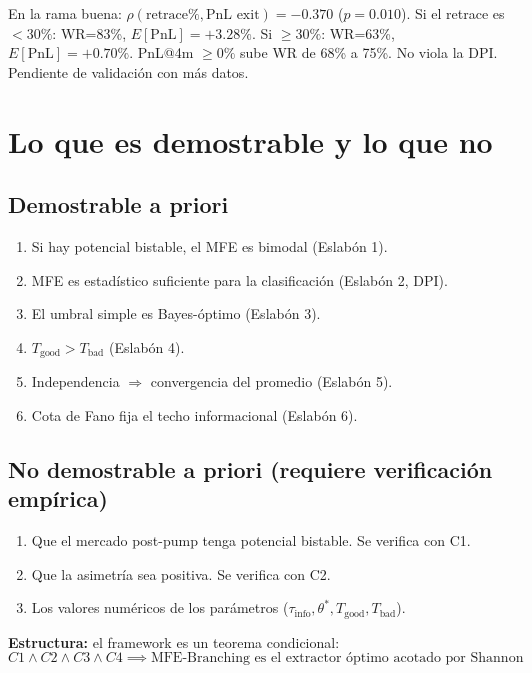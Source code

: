\documentclass[11pt,a4paper]{article}
\begin{document}
En la rama buena: $\rho(\text{retrace\%}, \text{PnL exit}) = -0.370$ ($p = 0.010$). Si el retrace es $< 30\%$: WR=83\%, $E[\text{PnL}] = +3.28\%$. Si $\geq 30\%$: WR=63\%, $E[\text{PnL}] = +0.70\%$. PnL@4m $\geq 0\%$ sube WR de 68\% a 75\%. No viola la DPI. Pendiente de validación con más datos.
 
\section{Lo que es demostrable y lo que no}
 
\subsection{Demostrable a priori}
\begin{enumerate}[leftmargin=*]
\item Si hay potencial bistable, el MFE es bimodal (Eslabón 1).
\item MFE es estadístico suficiente para la clasificación (Eslabón 2, DPI).
\item El umbral simple es Bayes-óptimo (Eslabón 3).
\item $T_{\text{good}} > T_{\text{bad}}$ (Eslabón 4).
\item Independencia $\Rightarrow$ convergencia del promedio (Eslabón 5).
\item Cota de Fano fija el techo informacional (Eslabón 6).
\end{enumerate}
 
\subsection{No demostrable a priori (requiere verificación empírica)}
\begin{enumerate}[leftmargin=*]
\item Que el mercado post-pump tenga potencial bistable. Se verifica con C1.
\item Que la asimetría sea positiva. Se verifica con C2.
\item Los valores numéricos de los parámetros ($\tau_{\text{info}}, \theta^*, T_{\text{good}}, T_{\text{bad}}$).
\end{enumerate}
 
\textbf{Estructura:} el framework es un teorema condicional:
\begin{equation}
\boxed{C1 \wedge C2 \wedge C3 \wedge C4 \implies \text{MFE-Branching es el extractor óptimo acotado por Shannon}}
\end{equation}
 
\end{document}
